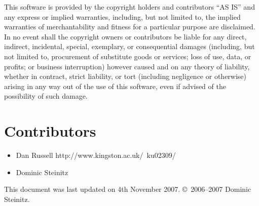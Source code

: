 \documentclass{article}
\begin{document}
\begin{sc}
This software is provided by the copyright holders and contributors ``AS IS'' 
and any express or implied warranties, including, but not limited to, 
the implied warranties of merchantability and fitness for a particular 
purpose are disclaimed. In no event shall the copyright owners or
contributors be liable for any direct, indirect, incidental, special,
exemplary, or consequential damages (including, but not limited to,
procurement of substitute goods or services; loss of use, data, or profits;
or business interruption) however caused and on any theory of liability,
whether in contract, strict liability, or tort (including negligence or
otherwise) arising in any way out of the use of this software,
even if advised of the possibility of such damage.
\end{sc}

\section{Contributors}

\begin{itemize}

\item
\htmladdnormallinkfoot
   {Dan Russell}
   {http://www.kingston.ac.uk/~ku02309/}

\item
Dominic Steinitz

\end{itemize}

This document was last updated on 4th November 2007.
\copyright\ 2006--2007 Dominic Steinitz. 
\end{document}
